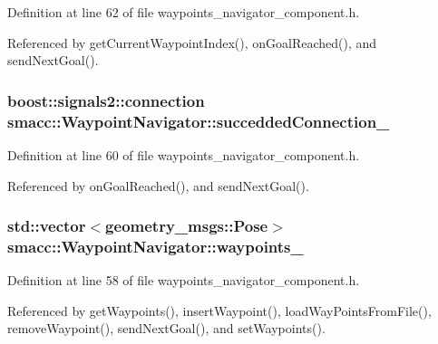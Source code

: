 Definition at line 62 of file waypoints\+\_\+navigator\+\_\+component.\+h.



Referenced by get\+Current\+Waypoint\+Index(), on\+Goal\+Reached(), and send\+Next\+Goal().

\subsubsection[{\texorpdfstring{succedded\+Connection\+\_\+}{succeddedConnection_}}]{\setlength{\rightskip}{0pt plus 5cm}boost\+::signals2\+::connection smacc\+::\+Waypoint\+Navigator\+::succedded\+Connection\+\_\+\hspace{0.3cm}{\ttfamily [private]}}\hypertarget{classsmacc_1_1WaypointNavigator_a932d5378c3ef5bd4e8e3152ac657112f}{}\label{classsmacc_1_1WaypointNavigator_a932d5378c3ef5bd4e8e3152ac657112f}


Definition at line 60 of file waypoints\+\_\+navigator\+\_\+component.\+h.



Referenced by on\+Goal\+Reached(), and send\+Next\+Goal().

\subsubsection[{\texorpdfstring{waypoints\+\_\+}{waypoints_}}]{\setlength{\rightskip}{0pt plus 5cm}std\+::vector$<$geometry\+\_\+msgs\+::\+Pose$>$ smacc\+::\+Waypoint\+Navigator\+::waypoints\+\_\+\hspace{0.3cm}{\ttfamily [private]}}\hypertarget{classsmacc_1_1WaypointNavigator_a59d691f2177430c407b8e27df07552e9}{}\label{classsmacc_1_1WaypointNavigator_a59d691f2177430c407b8e27df07552e9}


Definition at line 58 of file waypoints\+\_\+navigator\+\_\+component.\+h.



Referenced by get\+Waypoints(), insert\+Waypoint(), load\+Way\+Points\+From\+File(), remove\+Waypoint(), send\+Next\+Goal(), and set\+Waypoints().

